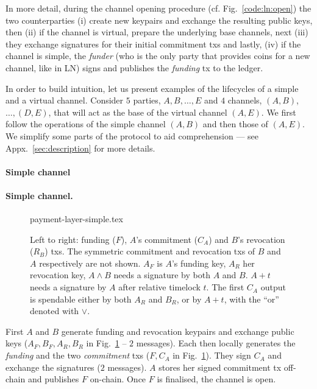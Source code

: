   In more detail, during the channel opening procedure (cf.
  Fig.~\ref{code:ln:open}) the two counterparties (i) create new keypairs and
  exchange the resulting public keys, then (ii) if the channel is
  virtual, prepare the underlying base channels, next (iii) they exchange
  signatures for their initial commitment txs
  and lastly, (iv) if the channel is simple, the \emph{funder} (who is the only
  party that provides coins for a new channel, like in LN) signs and publishes
  the \emph{funding} tx to the ledger.

  In order to build intuition, let us present examples of the
  lifecycles of a simple and a virtual channel. Consider $5$ parties, $A, B,
  \dots, E$ and $4$ channels, $(A, B)$, $\dots,(D, E)$, that will act as
  the base of the virtual channel $(A, E)$. We first follow the operations of
  the simple channel $(A, B)$ and then those of $(A, E)$. We simplify some parts
  of the protocol to aid comprehension --- see Appx.~\ref{sec:description} for
  more details.

  \makeatletter%
    {\paragraph{Simple channel}}%
    {\paragraph{Simple channel.}}%
  \makeatother%
  \addtolength{\intextsep}{-15pt}
  \begin{figure}[!htbp]
    \centering
    {payment-layer-simple.tex}
    \caption{Left to right: funding ($F$), $A$'s commitment ($C_A$) and $B$'s
    revocation ($R_B$) txs.
    The symmetric commitment and
    revocation txs of $B$ and $A$ respectively are not shown.
    $A_F$ is $A$'s funding key, $A_R$ her revocation key, $A \wedge B$ needs
    a signature by both $A$ and $B$. $A+t$ needs a signature
    by $A$ after relative timelock $t$. The first $C_A$ output is
    spendable either by both $A_R$ and $B_R$, or by $A + t$, with the ``or'' denoted with $\vee$.}
    \label{figure:payment-layer-simple}
  \end{figure}
  \addtolength{\intextsep}{15pt}

  First $A$ and $B$ generate funding and revocation keypairs and exchange
  public keys ($A_F, B_F, A_R, B_R$ in Fig.~\ref{figure:payment-layer-simple} --
  $2$ messages). Each then
  locally generates the \emph{funding} and the two \emph{commitment} txs
  ($F, C_A$ in Fig.~\ref{figure:payment-layer-simple}). They
  sign $C_A$ and exchange the
  signatures ($2$ messages). $A$ stores her
  signed commitment tx off-chain and publishes $F$ on-chain. Once $F$
  is finalised, the channel is open.

